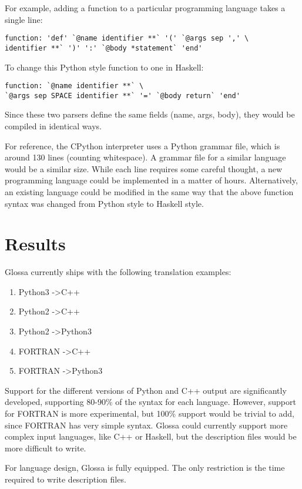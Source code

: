 \documentclass{article}
\begin{document}
For example, adding a function to a particular programming language takes a single line:
\begin{verbatim}
function: 'def' `@name identifier **` '(' `@args sep ',' \
identifier **` ')' ':' `@body *statement` 'end'
\end{verbatim}
To change this Python style function to one in Haskell:
\begin{verbatim}
function: `@name identifier **` \
`@args sep SPACE identifier **` '=' `@body return` 'end'
\end{verbatim}
Since these two parsers define the same fields (name, args, body), they would be compiled in identical ways.

For reference, the CPython interpreter uses a Python grammar file, which is around 130 lines (counting whitespace).
A grammar file for a similar language would be a similar size.
While each line requires some careful thought, a new programming language could be implemented in a matter of hours.
Alternatively, an existing language could be modified in the same way that the above function syntax was changed from Python style to Haskell style.

\section{Results}

Glossa currently ships with the following translation examples:
\begin{enumerate}
    \item Python3 -\textgreater C++
    \item Python2 -\textgreater C++ 
    \item Python2 -\textgreater Python3
    \item FORTRAN -\textgreater C++ 
    \item FORTRAN -\textgreater Python3 
\end{enumerate}

Support for the different versions of Python and C++ output are significantly developed, supporting 80-90\% of the syntax for each language. 
However, support for FORTRAN is more experimental, but 100\% support would be trivial to add, since FORTRAN has very simple syntax.
Glossa could currently support more complex input languages, like C++ or Haskell, but the description files would be more difficult to write.

For language design, Glossa is fully equipped. The only restriction is the time required to write description files.
\end{document}
